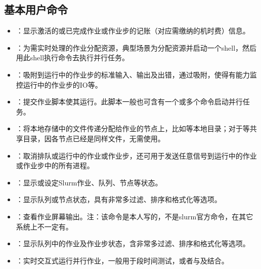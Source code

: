 \documentclass[a4paper,12pt,english]{sphinxmanual}
\begin{document}
\subsection{基本用户命令}
\label{\detokenize{slurm/slurm:id4}}\begin{itemize}
\item {} 
\sphinxAtStartPar
{}：显示激活的或已完成作业或作业步的记账（对应需缴纳的机时费）信息。

\item {} 
\sphinxAtStartPar
{}：为需实时处理的作业分配资源，典型场景为分配资源并启动一个shell，然后用此shell执行命令去执行并行任务。

\item {} 
\sphinxAtStartPar
{}：吸附到运行中的作业步的标准输入、输出及出错，通过吸附，使得有能力监控运行中的作业步的IO等。

\item {} 
\sphinxAtStartPar
{}：提交作业脚本使其运行。此脚本一般也可含有一个或多个命令启动并行任务。

\item {} 
\sphinxAtStartPar
{}：将本地存储中的文件传递分配给作业的节点上，比如等本地目录；对于等共享目录，因各节点已经是同样文件，无需使用。

\item {} 
\sphinxAtStartPar
{}：取消排队或运行中的作业或作业步，还可用于发送任意信号到运行中的作业或作业步中的所有进程。

\item {} 
\sphinxAtStartPar
{}：显示或设定Slurm作业、队列、节点等状态。

\item {} 
\sphinxAtStartPar
{}：显示队列或节点状态，具有非常多过滤、排序和格式化等选项。

\item {} 
\sphinxAtStartPar
{}：查看作业屏幕输出。注：该命令是本人写的，不是slurm官方命令，在其它系统上不一定有。

\item {} 
\sphinxAtStartPar
{}：显示队列中的作业及作业步状态，含非常多过滤、排序和格式化等选项。

\item {} 
\sphinxAtStartPar
{}：实时交互式运行并行作业，一般用于段时间测试，或者与及结合。

\end{itemize}
\end{document}
